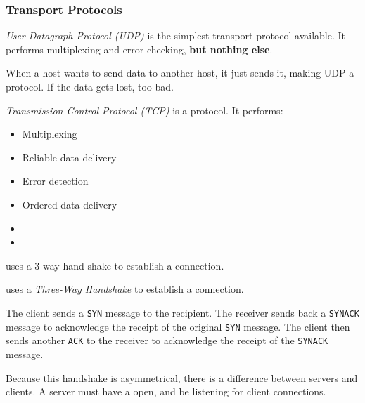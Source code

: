 \subsubsection{Transport Protocols}\label{subsubsec:Transport_Protocols}
\begin{definition}\label{def:User_Datagram_Protocol}
  \emph{User Datagraph Protocol (UDP)} is the simplest transport protocol available.
  It performs multiplexing and error checking, \textbf{but nothing else}.

  When a host wants to send data to another host, it just sends it, making UDP a  protocol.
  If the data gets lost, too bad.
\end{definition}

\begin{definition}\label{def:Transmission_Control_Protocol}
  \emph{Transmission Control Protocol (TCP)} is a  protocol.
  It performs:
  \begin{itemize}[noitemsep]
  \item Multiplexing
  \item Reliable data delivery
  \item Error detection
  \item Ordered data delivery
  \item {}
  \item {}
  \end{itemize}
\end{definition}

 uses a 3-way hand shake to establish a connection.
\begin{definition}\label{def:TCP_3_Way_Handshake}
   uses a \emph{Three-Way Handshake} to establish a connection.

  The client sends a \texttt{SYN} message to the recipient.
  The receiver sends back a \texttt{SYN\textunderscore{}ACK} message to acknowledge the receipt of the original \texttt{SYN} message.
  The client then sends another \texttt{ACK} to the receiver to acknowledge the receipt of the \texttt{SYN\textunderscore{}ACK} message.

  Because this handshake is asymmetrical, there is a difference between servers and clients.
  A server must have a  open, and be listening for client connections.
\end{definition}

